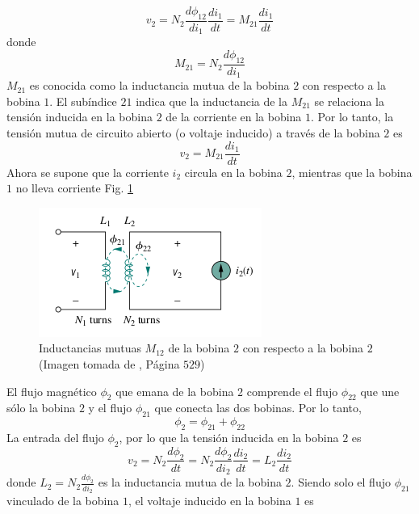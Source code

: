 \documentclass[twocolumn]{IEEEtran}
\begin{document}
\begin{equation}
 v_2 = N_2 \frac{d \phi _{12}}{d i_1} \frac{d i_1}{dt} = M_{21} \frac{d i_1}{d t}
\label{ecu8}
\end{equation}
\noindent
donde
\begin{equation}
 M_{21} = N_2 \frac{d \phi _{12}}{d i_1}
\label{ecu9}
\end{equation}
\noindent
$M_{21}$ es conocida como la inductancia mutua de la bobina $2$ con respecto a la bobina $1$. El subíndice $21$ indica que la inductancia de la $M_21$ se relaciona la tensión inducida en la bobina $2$ de la corriente en la bobina $1$. Por lo tanto, la tensión mutua de circuito abierto (o voltaje inducido) a través de la bobina $2$ es
\begin{equation}
 v_2 = M_{21} \frac{d i_1}{d t}
\label{ecu10}
\end{equation}
\noindent
Ahora se supone que la corriente $i_2$ circula en la bobina $2$, mientras que la bobina $1$ no lleva corriente Fig. \ref{fig3}
\begin{figure}[H]
	\centering
		\includegraphics[scale=0.6]{2bob.png}
	\caption{Inductancias mutuas $M_{12}$ de la bobina $2$ con respecto a la bobina $2$ (Imagen tomada de \cite{sadiku}, Página $529$)}
	\label{fig3}
\end{figure}
\noindent
El flujo magnético $\phi _2$ que emana de la bobina $2$ comprende el flujo $\phi _{22}$ que une sólo la bobina $2$ y el flujo $\phi _{21}$ que conecta las dos bobinas. Por lo tanto,
\begin{equation}
 \phi _2 = \phi _{21} + \phi _{22}
\label{ecu11}
\end{equation}
\noindent
La entrada del flujo $\phi _2$, por lo que la tensión inducida en la bobina $2$ es
\begin{equation}
 v_2 = N_2 \frac{d \phi _2}{d t} = N_2 \frac{d \phi _2}{d i_2} \frac{d i_2}{d t} = L_2 \frac{d i_2}{d t}
\label{ecu12}
\end{equation}
\noindent
donde $L_2 = N_2 \frac{d \phi _2}{d i_2}$ es la inductancia mutua de la bobina $2$. Siendo solo el flujo $\phi _{21}$ vinculado de la bobina $1$, el voltaje inducido en la bobina $1$ es
\end{document}
